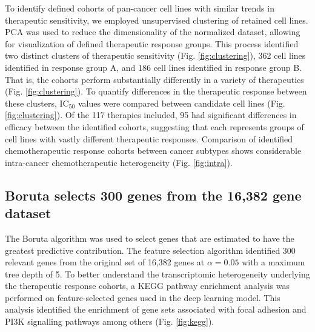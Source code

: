 \documentclass[10pt, letterpaper, twocolumn]{article}
\begin{document}
To identify defined cohorts of pan-cancer cell lines with similar trends in therapeutic sensitivity, we employed unsupervised clustering of retained cell lines. PCA was used to reduce the dimensionality of the normalized dataset, allowing for visualization of defined therapeutic response groups. This process identified two distinct clusters of therapeutic sensitivity (Fig. \ref{fig:clustering}), 362 cell lines identified in response group A, and 186 cell lines identified in response group B. That is, the cohorts perform substantially differently in a variety of therapeutics (Fig. \ref{fig:clustering}). To quantify differences in the therapeutic response between these clusters, IC$_{50}$ values were compared between candidate cell lines (Fig. \ref{fig:clustering}). Of the 117 therapies included, 95 had significant differences in efficacy between the identified cohorts, suggesting that each represents groups of cell lines with vastly different therapeutic responses. Comparison of identified chemotherapeutic response cohorts between cancer subtypes shows considerable intra-cancer chemotherapeutic heterogeneity (Fig. \ref{fig:intra}).


\subsection{Boruta selects 300 genes from the 16,382 gene dataset}
The Boruta algorithm was used to select genes that are estimated to have the greatest predictive contribution. The feature selection algorithm identified 300 relevant genes from the original set of 16,382 genes at $\alpha=0.05$ with a maximum tree depth of 5. To better understand the transcriptomic heterogeneity underlying the therapeutic response cohorts, a KEGG pathway enrichment analysis was performed on feature-selected genes used in the deep learning model. This analysis identified the enrichment of gene sets associated with focal adhesion and PI3K signalling pathways among others (Fig. \ref{fig:kegg}).
\end{document}
